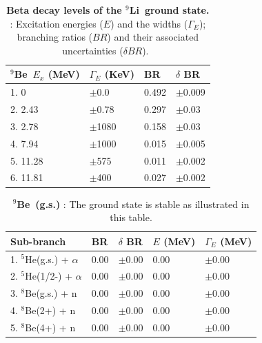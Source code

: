 \documentclass{JINST}
\newcommand{\li}{$^{9}$Li~}
\newcommand{\beNINE}{$^{9}$Be~}
\begin{document}
\begin{table}[tb]
\caption{\label{tab:betaStates} {\bf Beta decay levels of the \li ground state. 
}: Excitation energies ($E$) and the widths ($\Gamma_E$); branching ratios
($BR$) and their associated uncertainties ($\delta BR $).~\cite{Tilley2004155}}
\begin{center}
\begin{small}
\begin{tabular}{l l l l }
\hline
\hline
\beNINE $E_x$ (MeV) & $\Gamma_E$ (KeV)& BR & $\delta$ BR   \\
\hline
1. 0 & $\pm$0.0& 0.492 & $\pm$0.009   \\ 
2. 2.43& $\pm$0.78 & 0.297 & $\pm$0.03   \\
3. 2.78  & $\pm$1080& 0.158 & $\pm$0.03   \\
4. 7.94 & $\pm$1000 & 0.015 & $\pm$0.005   \\
5. 11.28 & $\pm$575 & 0.011 & $\pm$0.002   \\
6. 11.81 & $\pm$400 & 0.027 & $\pm$0.002   \\
\hline
\hline
\end{tabular}
\end{small}
\end{center}
\end{table}



\begin{table}[tb]

\caption{\label{tabgs} {\bf \beNINE (g.s.) }: The ground state is stable as illustrated in this table.}

\begin{center}
\begin{small}
\begin{tabular}{l l l l l}
\hline
\hline
Sub-branch & BR & $\delta$ BR & $E$ (MeV) & $\Gamma_E$ (MeV) \\
\hline
1. $^{5}$He(g.s.) + $\alpha$ & 0.00 & $\pm$0.00 & 0.00 & $\pm$0.00 \\ 
2. $^{5}$He(1/2-) + $\alpha$ & 0.00 & $\pm$0.00 & 0.00 & $\pm$0.00 \\
3. $^{8}$Be(g.s.) + n & 0.00 & $\pm$0.00 & 0.00 & $\pm$0.00 \\
4. $^{8}$Be(2+) + n  & 0.00 & $\pm$0.00 & 0.00 & $\pm$0.00 \\
5. $^{8}$Be(4+) + n & 0.00 & $\pm$0.00  &  0.00 & $\pm$0.00 \\
\hline
\hline
\end{tabular}
\end{small}
\end{center}
\end{table}
\end{document}
